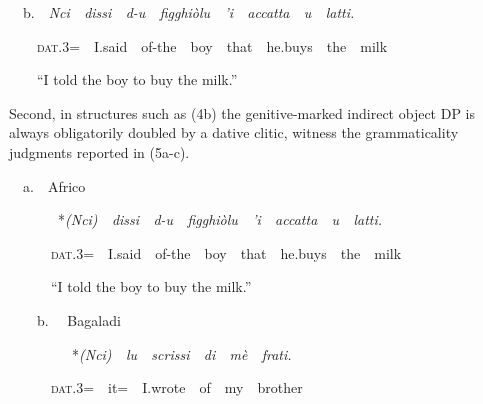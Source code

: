 \documentclass[output=paper,modfonts,nonflat]{langsci/langscibook}
\begin{document}
\begin{styleStandard}
\ \ b.\ \ \textit{Nci\ \ dissi\ \ d-u\ \ figghiòlu\ \ ’i\ \ accatta\ \ u\ \ latti.}
\end{styleStandard}

\begin{styleesempi}
\ \ \ \ \textsc{dat}.3=\ \ I.said\ \ of-the\ \ boy\ \ that\ \ he.buys\ \ the\ \ milk
\end{styleesempi}

\begin{styleesempi}
\ \ \ \ “I told the boy to buy the milk.” 
\end{styleesempi}

\begin{styleStandard}
Second, in structures such as (4b) the genitive-marked indirect object DP is always obligatorily doubled by a dative clitic, witness the grammaticality judgments reported in (5a-c). 
\end{styleStandard}

\begin{listWWNumviiileveli}
\item 
\begin{styleListParagraph}
\ \ a.\ \ Africo
\end{styleListParagraph}
\end{listWWNumviiileveli}
\begin{styleListParagraph}
\ \ \ \  \ \ \ *\textit{(Nci)\ \ dissi\ \ d-u\ \ figghiòlu\ \ ’i\ \ accatta\ \ u\ \ latti.}
\end{styleListParagraph}

\begin{styleesempi}
\ \ \ \ \ \ \textsc{dat}.3=\ \ I.said\ \ of-the\ \ boy\ \ that\ \ he.buys\ \ the\ \ milk
\end{styleesempi}

\begin{styleesempi}
\ \ \ \ \ \ “I told the boy to buy the milk.”
\end{styleesempi}

\begin{styleesempi}
\ \ \ \ b. \ \ Bagaladi
\end{styleesempi}

\begin{styleesempi}
\ \ \ \  \ \ \ \ \ *\textit{(Nci)\ \ lu\ \ scrissi\ \ di\ \ mè\ \ frati.}
\end{styleesempi}

\begin{styleStandard}
\ \ \ \ \ \ \textsc{dat}.3=\ \ it=\ \ I.wrote\ \ of\ \ my\ \ brother
\end{styleStandard}
\end{document}
